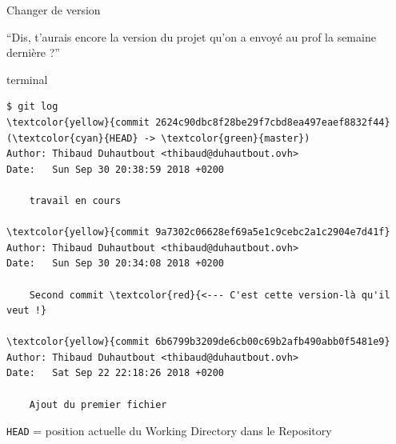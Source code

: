 \documentclass[usepdftitle=false]{beamer}
\def\seplength{.3\topsep}
\newcommand{\Pause}{%
\ifdef{\Release}
  {\pause}
  {}
}
\begin{document}
\begin{frame}[fragile]{Changer de version}
	\begin{block}{}
		\enquote{Dis, t'aurais encore la version du projet qu'on a envoyé au prof la semaine dernière ?}
	\end{block}

	\vfill

	\Pause

	\begin{beamercolorbox}[rounded=true,shadow=true]{terminal}
\vspace{-\seplength}
\begin{Verbatim}
$ git log
\textcolor{yellow}{commit 2624c90dbc8f28be29f7cbd8ea497eaef8832f44} (\textcolor{cyan}{HEAD} -> \textcolor{green}{master})
Author: Thibaud Duhautbout <thibaud@duhautbout.ovh>
Date:   Sun Sep 30 20:38:59 2018 +0200

    travail en cours

\textcolor{yellow}{commit 9a7302c06628ef69a5e1c9cebc2a1c2904e7d41f}
Author: Thibaud Duhautbout <thibaud@duhautbout.ovh>
Date:   Sun Sep 30 20:34:08 2018 +0200

    Second commit \textcolor{red}{<--- C'est cette version-là qu'il veut !}

\textcolor{yellow}{commit 6b6799b3209de6cb00c69b2afb490abb0f5481e9}
Author: Thibaud Duhautbout <thibaud@duhautbout.ovh>
Date:   Sat Sep 22 22:18:26 2018 +0200

    Ajout du premier fichier
\end{Verbatim}
	\end{beamercolorbox}

	\vfill

		\verb+HEAD+ = position actuelle du Working Directory dans le Repository
\end{frame}
\end{document}
